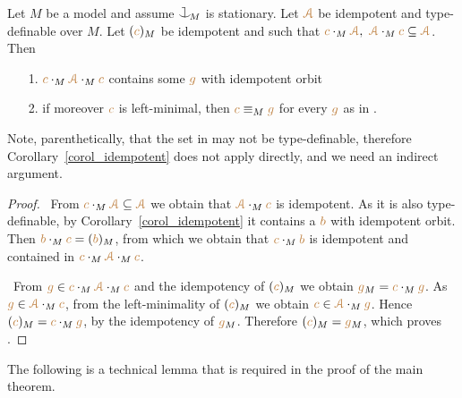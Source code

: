 \begin{proposition}\label{prop_minimal_existence2}
Let $M$ be a model and assume $\cnonfork_{\!M}$ is stationary.
Let ${\color{brown}\EuScript A}$ be idempotent and type-definable over $M$.
Let $({\color{brown} c})_M$ be idempotent and such that 
${\mr c}\cdot_M\mrA,\ \mrA\cdot_M{\mr c}\subseteq\mrA$.
Then
\begin{itemize}
\item[1.]  ${\color{brown} c}\cdot_M{\color{brown}\EuScript A}\cdot_M{\color{brown} c}$ contains some ${\color{brown} g}$ with idempotent orbit 
\item[2.] if moreover ${\color{brown} c}$ is left-minimal, then ${\color{brown} c}\equiv_M{\color{brown} g}$ for every ${\color{brown} g}$ as in .
\end{itemize} 
\end{proposition}

Note, parenthetically, that the set in  may not be type-definable, 
therefore Corollary~\ref{corol_idempotent} does not apply 
directly, and we need an indirect argument.

\begin{proof} \  
From ${\color{brown} c}\cdot_M{\color{brown}\EuScript A}\subseteq{\color{brown}\EuScript A}$ we obtain that ${\color{brown}\EuScript A}\cdot_M{\color{brown} c}$ is idempotent.
As it is  also type-definable, 
by Corollary~\ref{corol_idempotent} it contains a ${\color{brown} b}$ with idempotent orbit.
Then ${\color{brown} b}\cdot_M{\color{brown} c}=({\color{brown} b})_M$, from which we obtain that ${\color{brown} c}\cdot_M{\color{brown} b}$ is idempotent and contained in ${\color{brown} c}\cdot_M{\color{brown}\EuScript A}\cdot_M{\color{brown} c}$.

 \ From ${\color{brown} g}\in{\color{brown}c}\cdot_M{\color{brown}\EuScript A}\cdot_M{\color{brown} c}$ and the idempotency of $({\color{brown} c})_M$ 
we obtain ${\color{brown} g}_M={\color{brown} c}\cdot_M{\color{brown} g}$.
As ${\color{brown} g}\in{\color{brown}\EuScript A}\cdot_M{\color{brown} c}$, from the left-minimality of $({\color{brown} c})_M$ we obtain ${\color{brown} c}\in{\color{brown}\EuScript A}\cdot_M{\color{brown} g}$.
Hence $({\color{brown} c})_M={\color{brown} c}\cdot_M{\color{brown} g}$, by the idempotency of ${\color{brown} g}_M$.
Therefore $({\color{brown} c})_M={\color{brown} g}_M$, which proves \ssf{2}.
\end{proof}

The following is a technical lemma that is required in the proof of the main theorem.

